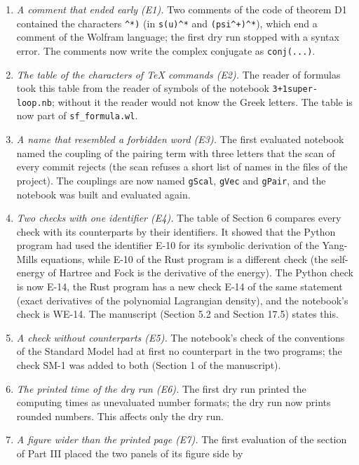 \documentclass[
  10pt,
]{article}
\begin{document}
\begin{enumerate}
\def\labelenumi{\arabic{enumi}.}
\item
  \emph{A comment that ended early (E1).} Two comments of the code of
  theorem D1 contained the characters \texttt{\^{}*)} (in
  \texttt{s(u)\^{}*} and \texttt{(psi\^{}+)\^{}*}), which end a comment
  of the Wolfram language; the first dry run stopped with a syntax
  error. The comments now write the complex conjugate as
  \texttt{conj(...)}.
\item
  \emph{The table of the characters of TeX commands (E2).} The reader of
  formulas took this table from the reader of symbols of the notebook
  \texttt{3+1super-loop.nb}; without it the reader would not know the
  Greek letters. The table is now part of \texttt{sf\_formula.wl}.
\item
  \emph{A name that resembled a forbidden word (E3).} The first
  evaluated notebook named the coupling of the pairing term with three
  letters that the scan of every commit rejects (the scan refuses a
  short list of names in the files of the project). The couplings are
  now named \texttt{gScal}, \texttt{gVec} and \texttt{gPair}, and the
  notebook was built and evaluated again.
\item
  \emph{Two checks with one identifier (E4).} The table of Section 6
  compares every check with its counterparts by their identifiers. It
  showed that the Python program had used the identifier E-10 for its
  symbolic derivation of the Yang-Mills equations, while E-10 of the
  Rust program is a different check (the self-energy of Hartree and Fock
  is the derivative of the energy). The Python check is now E-14, the
  Rust program has a new check E-14 of the same statement (exact
  derivatives of the polynomial Lagrangian density), and the notebook's
  check is WE-14. The manuscript (Section 5.2 and Section 17.5) states
  this.
\item
  \emph{A check without counterparts (E5).} The notebook's check of the
  conventions of the Standard Model had at first no counterpart in the
  two programs; the check SM-1 was added to both (Section 1 of the
  manuscript).
\item
  \emph{The printed time of the dry run (E6).} The first dry run printed
  the computing times as unevaluated number formats; the dry run now
  prints rounded numbers. This affects only the dry run.
\item
  \emph{A figure wider than the printed page (E7).} The first evaluation
  of the section of Part III placed the two panels of its figure side by

\end{enumerate}
\end{document}
